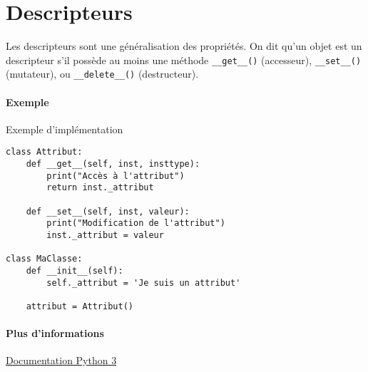 \section{Descripteurs}
Les descripteurs sont une généralisation des propriétés. On dit qu'un objet est un descripteur s'il possède au moins une méthode \texttt{__get__()} (accesseur), \texttt{__set__()} (mutateur), ou \texttt{__delete__()} (destructeur).

\paragraph{Exemple} Exemple d'implémentation
\begin{verbatim}
class Attribut:
    def __get__(self, inst, insttype):
        print("Accès à l'attribut")
        return inst._attribut

    def __set__(self, inst, valeur):
        print("Modification de l'attribut")
        inst._attribut = valeur

class MaClasse:
    def __init__(self):
        self._attribut = 'Je suis un attribut'

    attribut = Attribut()
\end{verbatim}

\paragraph{Plus d'informations} \href{https://docs.python.org/3/howto/descriptor.html}{Documentation Python 3}

